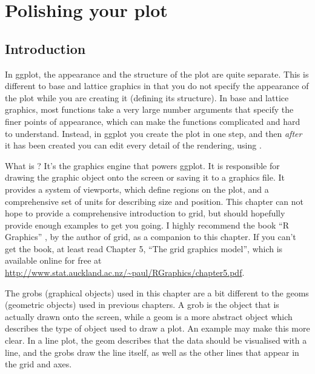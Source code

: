 

\chapter{Polishing your plot}
\label{cha:grid}

\section{Introduction}

In ggplot, the appearance and the structure of the plot are quite separate.  This is different to base and lattice graphics in that you do not specify the appearance of the plot while you are creating it (defining its structure).  In base and lattice graphics, most functions take a very large number arguments that specify the finer points of appearance, which can make the functions complicated and hard to understand.  Instead, in ggplot you create the plot in one step, and then {\em after} it has been created you can edit every detail of the rendering, using .


What is ?  It's the graphics engine that powers ggplot.  It is responsible for drawing the graphic object onto the screen or saving it to a graphics file.  It provides a system of viewports, which define regions on the plot, and a comprehensive set of units for describing size and position. This chapter can not hope to provide a comprehensive introduction to grid, but should hopefully provide enough examples to get you going.   I highly recommend the book ``R Graphics'' \citep{murrell:2005}, by the author of grid,  as a companion to this chapter.  If you can't get the book, at least read Chapter 5, ``The grid graphics model'', which is available online for free at  \url{http://www.stat.auckland.ac.nz/~paul/RGraphics/chapter5.pdf}.

The grobs (graphical objects) used in this chapter are a bit different to the geoms (geometric objects) used in previous chapters.  A grob is the object that is actually drawn onto the screen, while a geom is a more abstract object which describes the type of object used to draw a plot.  An example may make this more clear. In a line plot, the geom describes that the data should be visualised with a line, and the grobs draw the line itself, as well as the other lines that appear in the grid and axes.

